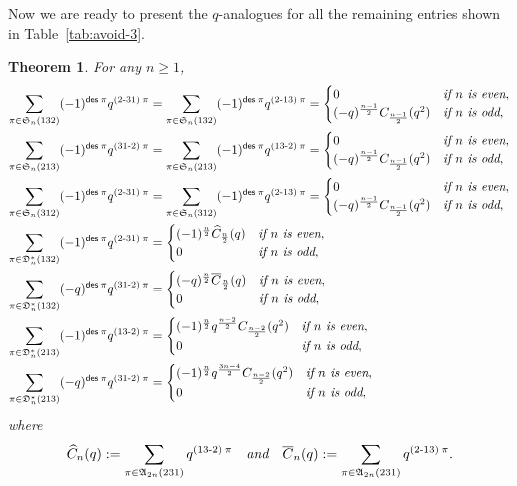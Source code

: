 \documentclass[12pt,reqno]{amsart}
\numberwithin{equation}{section}
\theoremstyle{plain}
\newtheorem{theorem}{Theorem}[section]
\theoremstyle{definition}
\def\S{\mathfrak{S}}
\def\D{\mathfrak{D}}
\def\A{\mathfrak{A}}
\def\des{\mathsf{des}}
\def\cab{31\text{-}2}
\def\bca{2\text{-}31}
\def\acb{13\text{-}2}
\def\bac{2\text{-}13}
\begin{document}
Now we are ready to present the $q$-analogues for all the remaining entries shown in Table~\ref{tab:avoid-3}.

\begin{theorem}\label{qnara-des}
For any $n\ge 1$,
\begin{align}
\label{q132-des-odd}
\sum_{\pi\in\S_n(132)}(-1)^{\des\:\pi}q^{(\bca)\:\pi}&=\sum_{\pi\in\S_n(132)}(-1)^{\des\:\pi}q^{(\bac)\:\pi}=\begin{cases}0 & \emph{if $n$ is even},\\
(-q)^{\frac{n-1}{2}}C_{\frac{n-1}{2}}(q^2) & \emph{if $n$ is odd},
\end{cases}\\
\label{q213-des-odd}
\sum_{\pi\in\S_n(213)}(-1)^{\des\:\pi}q^{(\cab)\:\pi}&=\sum_{\pi\in\S_n(213)}(-1)^{\des\:\pi}q^{(\acb)\:\pi}=\begin{cases}0 & \emph{if $n$ is even},\\
(-q)^{\frac{n-1}{2}}C_{\frac{n-1}{2}}(q^2) & \emph{if $n$ is odd},
\end{cases}\\
\label{q312-des-odd}
\sum_{\pi\in\S_n(312)}(-1)^{\des\:\pi}q^{(\bca)\:\pi}&=\sum_{\pi\in\S_n(312)}(-1)^{\des\:\pi}q^{(\bac)\:\pi}=\begin{cases}0 & \emph{if $n$ is even},\\
(-q)^{\frac{n-1}{2}}C_{\frac{n-1}{2}}(q^2) & \emph{if $n$ is odd},
\end{cases}\\
\label{q132-des-even1}
\sum_{\pi\in\D^*_n(132)}(-1)^{\des\:\pi}q^{(\bca)\:\pi}&=\begin{cases}(-1)^{\frac{n}{2}}\widehat{C}_{\frac{n}{2}}(q) & \emph{if $n$ is even},\\
0 & \emph{if $n$ is odd},
\end{cases}\\
\label{q132-des-even2}
\sum_{\pi\in\D^*_n(132)}(-q)^{\des\:\pi}q^{(\cab)\:\pi}&=\begin{cases}(-q)^{\frac{n}{2}}\overline{C}_{\frac{n}{2}}(q) & \emph{if $n$ is even},\\
0 & \emph{if $n$ is odd},
\end{cases}\\
\label{q213-des-even1}
\sum_{\pi\in\D^*_n(213)}(-1)^{\des\:\pi}q^{(\acb)\:\pi}&=\begin{cases}(-1)^{\frac{n}{2}}q^{\frac{n-2}{2}}C_{\frac{n-2}{2}}(q^2) & \emph{if $n$ is even},\\
0 & \emph{if $n$ is odd},
\end{cases}\\
\label{q213-des-even2}
\sum_{\pi\in\D^*_n(213)}(-q)^{\des\:\pi}q^{(\cab)\:\pi}&=\begin{cases}(-1)^{\frac{n}{2}}q^{\frac{3n-4}{2}}C_{\frac{n-2}{2}}(q^2) & \emph{if $n$ is even},\\
0 & \emph{if $n$ is odd},
\end{cases}
\end{align}
where
\begin{align*}
\widehat{C}_n(q):=\sum\limits_{\pi\in\A_{2n}(231)}q^{(\acb)\:\pi}\quad \emph{and} \quad\overline{C}_n(q):=\sum\limits_{\pi\in\A_{2n}(231)}q^{(\bac)\:\pi}.
\end{align*}
\end{theorem}
\end{document}
